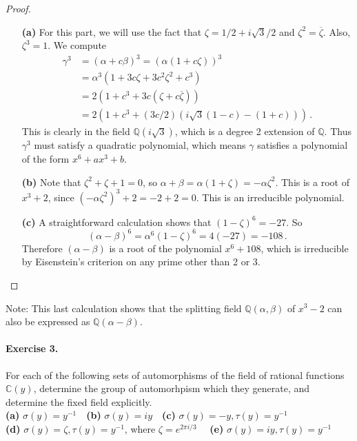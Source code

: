 \documentclass{article}
\newcommand{\Q}{\mathbb Q}
\newcommand{\inv}{^{-1}}
\begin{document}
\begin{proof} \hfill 

\begin{itemize}
\item[{\bf(a)}] For this part, we will use the fact that $\zeta=1/2+i\sqrt3/2$ and $\zeta^2=\overline\zeta$. Also, $\zeta^3=1$. We compute
\begin{align*}
\gamma^3&=(\alpha+c\beta)^3=(\alpha(1+c\zeta))^3\\
&=\alpha^3(1+3c\zeta+3c^2\zeta^2+c^3)\\
&=2(1+c^3+3c(\zeta+c\overline\zeta))\\
&=2(1+c^3+(3c/2)(i\sqrt3(1-c)-(1+c)))\,.
\end{align*}
This is clearly in the field $\Q(i\sqrt3)$, which is a degree 2
extension of $\Q$. Thus $\gamma^3$ must satisfy a quadratic
polynomial, which means $\gamma$ satisfies a polynomial of
the form $x^6+ax^3+b$. 

\item[{\bf(b)}] Note that $\zeta^2+\zeta+1=0$, so $\alpha+\beta=\alpha(1+\zeta)=-\alpha\zeta^2$. This is a root of $x^3+2$, since
$(-\alpha\zeta^2)^3+2=-2+2=0$. This is an irreducible polynomial.

\item[{\bf(c)}] A straightforward calculation shows that $(1-\zeta)^6=-27$. So
$$(\alpha-\beta)^6=\alpha^6(1-\zeta)^6=4(-27)=-108\,.$$
Therefore $(\alpha-\beta)$ is a root of the polynomial $x^6+108$,
which is irreducible by Eisenstein's criterion on any prime other than
2 or 3. 
\end{itemize}
\end{proof}
\noindent Note: This last calculation shows that the splitting field $\Q(\alpha,\beta)$ of $x^3-2$ can also be expressed as $\Q(\alpha-\beta)$.

\paragraph{Exercise 3.} For each of the following sets of automorphisms of the field of rational functions $\mathbb C(y)$, determine the group of automorhpism which they generate, and determine the fixed field explicitly.\\
{\bf(a)} $\sigma(y) = y\inv$\ \
{\bf(b)} $\sigma(y)=iy$\ \
{\bf(c)} $\sigma(y)=-y, \tau(y)=y\inv$\\
{\bf(d)} $\sigma(y)=\zeta, \tau(y)=y\inv$, where $\zeta=e^{2\pi i/3}$ \ \
{\bf(e)} $\sigma(y)=iy, \tau(y)=y\inv$
\end{document}

